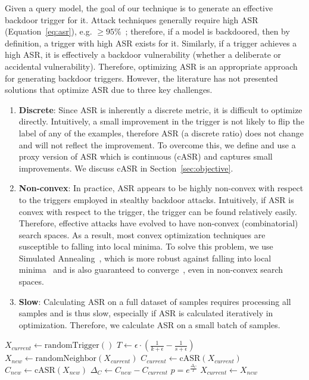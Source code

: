 \documentclass[letterpaper,twocolumn,10pt]{article}
\begin{document}
Given a query model, the goal of our technique is to generate an effective backdoor trigger for it. Attack techniques generally require high ASR (Equation~\ref{eq:asr}), e.g. $\geq 95\%$~\cite{li2022survey}; therefore, if a model is backdoored, then by definition, a trigger with high ASR exists for it. Similarly, if a trigger achieves a high ASR, it is effectively a backdoor vulnerability (whether a deliberate or accidental vulnerability). Therefore, optimizing ASR is an appropriate approach for generating backdoor triggers. However, the literature has not presented solutions that optimize ASR due to three key challenges.
\begin{enumerate}
\item \textbf{Discrete}: Since ASR is inherently a discrete metric, it is difficult to optimize directly. Intuitively, a small improvement in the trigger is not likely to flip the label of any of the examples, therefore ASR (a discrete ratio) does not change and will not reflect the improvement. To overcome this, we define and use a proxy version of ASR which is continuous (cASR) and captures small improvements. We discuss cASR in Section~\ref{sec:objective}.
\item \textbf{Non-convex}: In practice, ASR appears to be highly non-convex with respect to the triggers employed in stealthy backdoor attacks. Intuitively, if ASR is convex with respect to the trigger, the trigger can be found relatively easily. Therefore, effective attacks have evolved to have non-convex (combinatorial) search spaces. As a result, most convex optimization techniques are susceptible to falling into local minima. To solve this problem, we use Simulated Annealing~\cite{vanLaarhoven1987annealing}, which is more robust against falling into local minima~\cite{styblinski1990experiments} and is also guaranteed to converge~\cite{chib1995metro, adams1994convergence}, even in non-convex search spaces.
\item \textbf{Slow}: Calculating ASR on a full dataset of samples requires processing all samples and is thus slow, especially if ASR is calculated iteratively in optimization. Therefore, we calculate ASR on a small batch of samples.
\end{enumerate}

\begin{algorithm}[!t]
\caption{Simulated Annealing for Trigger Generation}
\label{alg:search}
\begin{algorithmic}[1]
\State $X_{current} \gets \mathrm{randomTrigger}()$
\State $T \gets \epsilon \cdot (\frac{1}{k+\epsilon}-\frac{1}{s+\epsilon})$
\State $X_{new} \gets \mathrm{randomNeighbor}(X_{current})$
\State $C_{current} \gets \mathrm{cASR}(X_{current})$
\State $C_{new} \gets \mathrm{cASR}(X_{new})$
\State $\Delta_{C} \gets C_{new}-C_{current}$
\State $p=e^{\frac{\Delta_{C}}{T}}$
    \State $X_{current} \gets X_{new}$
\EndIf
\EndFor
\end{algorithmic}
\end{algorithm}
\vspace{-3mm}
\end{document}
